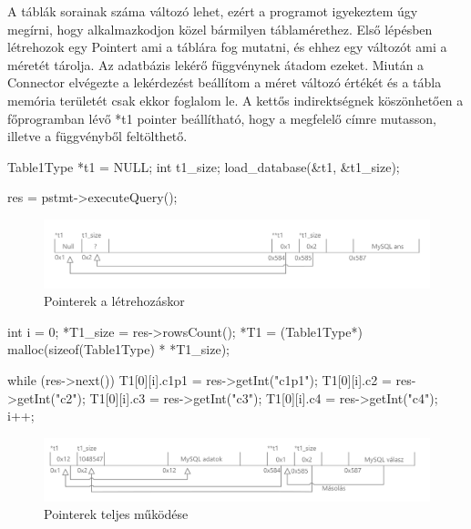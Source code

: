 A táblák sorainak száma változó lehet, ezért a programot igyekeztem úgy megírni, hogy alkalmazkodjon közel bármilyen táblamérethez.
Első lépésben létrehozok egy Pointert ami a táblára fog mutatni, és ehhez egy változót ami a méretét tárolja. Az adatbázis lekérő függvénynek átadom ezeket.
Miután a Connector elvégezte a lekérdezést beállítom a méret változó értékét és a tábla memória területét csak ekkor foglalom le. A kettős indirektségnek köszönhetően a főprogramban lévő *t1 pointer beállítható, hogy a megfelelő címre mutasson, illetve a függvényből feltölthető.
\begin{cpp}
Table1Type *t1 = NULL;
int t1_size;
load_database(&t1, &t1_size);
	
res = pstmt->executeQuery();
\end{cpp}
\begin{figure}[h!]
\centering
\includegraphics[width=\textwidth]{images/pointer1.png}
\caption{Pointerek a létrehozáskor}
\label{fig:opencl}
\end{figure}

\begin{cpp}
int i = 0;
*T1_size = res->rowsCount();
*T1 = (Table1Type*) malloc(sizeof(Table1Type) * *T1_size);

while (res->next())
{
	T1[0][i].c1p1 = res->getInt("c1p1");
	T1[0][i].c2 = res->getInt("c2");
	T1[0][i].c3 = res->getInt("c3");
	T1[0][i].c4 = res->getInt("c4");
	i++;
}
\end{cpp}

\begin{figure}[h!]
\centering
\includegraphics[width=\textwidth]{images/pointer2.png}
\caption{Pointerek teljes működése}
\label{fig:opencl}
\end{figure}

